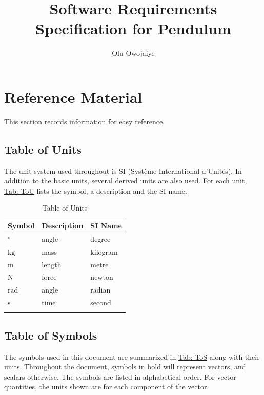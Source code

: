 \documentclass[12pt]{article}
\title{Software Requirements Specification for Pendulum}
\author{Olu Owojaiye}
\begin{document}
\maketitle
\tableofcontents
\newpage
\section{Reference Material}
\label{Sec:RefMat}
This section records information for easy reference.

\subsection{Table of Units}
\label{Sec:ToU}
The unit system used throughout is SI (Système International d'Unités). In addition to the basic units, several derived units are also used. For each unit, \hyperref[Table:ToU]{Tab: ToU} lists the symbol, a description and the SI name.

\begin{longtable}{l l l}
\toprule
\textbf{Symbol} & \textbf{Description} & \textbf{SI Name}
\\
\midrule
\endhead
${{}^{\circ}}$ & angle & degree
\\
${\text{kg}}$ & mass & kilogram
\\
${\text{m}}$ & length & metre
\\
${\text{N}}$ & force & newton
\\
${\text{rad}}$ & angle & radian
\\
${\text{s}}$ & time & second
\\
\bottomrule
\caption{Table of Units}
\label{Table:ToU}
\end{longtable}
\subsection{Table of Symbols}
\label{Sec:ToS}
The symbols used in this document are summarized in \hyperref[Table:ToS]{Tab: ToS} along with their units. Throughout the document, symbols in bold will represent vectors, and scalars otherwise. The symbols are listed in alphabetical order. For vector quantities, the units shown are for each component of the vector.
\end{document}
